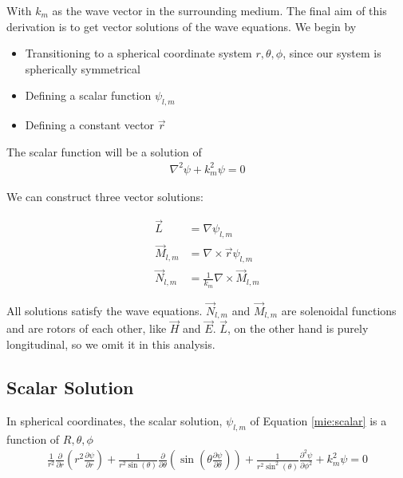         With $k_m$ as the wave vector in the surrounding medium. The final aim of this derivation is to get vector solutions
        of the wave equations. We begin by
        \begin{itemize}
            \item Transitioning to a spherical coordinate system ${r, \theta, \phi}$, since our system is spherically symmetrical
            \item Defining a scalar function $\psi_{l,m}$
            \item Defining a constant vector $\vec{r}$
        \end{itemize}

        The scalar function will be a solution of
        \begin{align}
            \nabla^2\psi + k^2_m\psi = 0 \label{mie:scalar}
        \end{align}

        We can construct three vector solutions:

        \begin{align}
            \vec{L} &= \nabla\psi_{l,m} \\
            \vec{M}_{l,m} &= \nabla\times\vec{r}\psi_{l,m} \\
            \vec{N}_{l,m} &= \frac{1}{k_m}\nabla\times\vec{M}_{l,m}
        \end{align}

        All solutions satisfy the wave equations. $\vec{N}_{l,m}$ and $\vec{M}_{l,m}$ are solenoidal functions and are rotors of each other,
        like $\vec{H}$ and $\vec{E}$. $\vec{L}$, on the other hand is purely longitudinal, so we omit it in this analysis.

    \subsection{Scalar Solution}

        In spherical coordinates, the scalar solution, $\psi_{l,m}$ of Equation \ref{mie:scalar} is a function of ${R, \theta, \phi}$
        \begin{align}
            \frac{1}{r^2}\frac{\partial}{\partial r}\left(r^2\frac{\partial\psi}{\partial r}\right)
                + \frac{1}{r^2\sin(\theta)}\frac{\partial}{\partial\theta}\left(\sin(\theta\frac{\partial\psi}{\partial\theta})\right)
                + \frac{1}{r^2\sin^2(\theta)}\frac{\partial^2\psi}{\partial\phi^2} + k^2_m\psi = 0
        \end{align}

